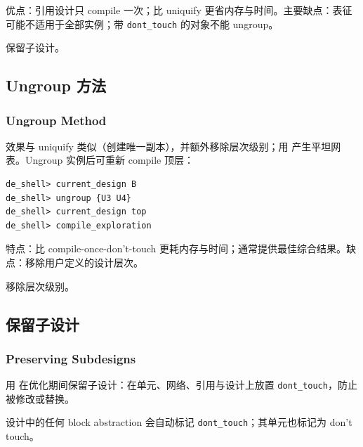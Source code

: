 
优点：引用设计只 compile 一次；比 uniquify 更省内存与时间。主要缺点：表征可能不适用于全部实例；带 \texttt{dont\_touch} 的对象不能 ungroup。

\begin{seeAlsoBox}
保留子设计。
\end{seeAlsoBox}

\subsection{Ungroup 方法}
\subsubsection*{Ungroup Method}

效果与 uniquify 类似（创建唯一副本），并额外移除层次级别；用  产生平坦网表。Ungroup 实例后可重新 compile 顶层：
\begin{lstlisting}
de_shell> current_design B
de_shell> ungroup {U3 U4}
de_shell> current_design top
de_shell> compile_exploration
\end{lstlisting}


特点：比 compile-once-don't-touch 更耗内存与时间；通常提供最佳综合结果。缺点：移除用户定义的设计层次。

\begin{seeAlsoBox}
移除层次级别。
\end{seeAlsoBox}

\subsection{保留子设计}
\subsubsection*{Preserving Subdesigns}

用  在优化期间保留子设计：在单元、网络、引用与设计上放置 \texttt{dont\_touch}，防止被修改或替换。

\begin{noteBox}
设计中的任何 block abstraction 会自动标记 \texttt{dont\_touch}；其单元也标记为 don't touch。
\end{noteBox}

